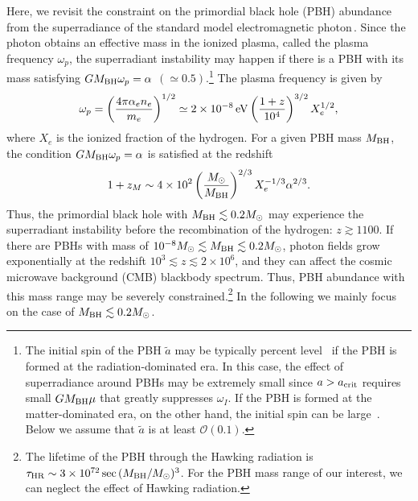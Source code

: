 \documentclass[%
 preprint,
 nofootinbib,
 amsmath,amssymb,
 aps,
 a4paper
]{revtex4-1}
\begin{document}
Here, we revisit the constraint on the primordial black hole (PBH) abundance from the superradiance of the standard model electromagnetic photon\,\cite{Pani:2013hpa}.
Since the photon obtains an effective mass in the ionized plasma, called the plasma frequency $\omega_p$, the superradiant instability may happen if there is a PBH with its mass satisfying $GM_{\rm BH}\omega_p = \alpha$ $(\simeq 0.5)$.\footnote{
	The initial spin of the PBH $\tilde a$ may be typically percent level~\cite{Chiba:2017rvs,Mirbabayi:2019uph,DeLuca:2019buf} if the PBH is formed at the radiation-dominated era. In this case, the effect of superradiance around PBHs may be extremely small since $a> a_{\rm crit}$ requires small $GM_{\rm BH}\mu$ that greatly suppresses $\omega_I$. If the PBH is formed at the matter-dominated era, on the other hand, the initial spin can be large~\cite{Harada:2017fjm}. Below we assume that $\tilde a$ is at least $\mathcal O(0.1)$.
} The plasma frequency is given by
\begin{align}
	\omega_p = \left( \frac{4\pi \alpha_e n_e}{m_e} \right)^{1/2} \simeq 2\times 10^{-8}\,{\rm eV}\left( \frac{1+z}{10^4} \right)^{3/2} X_e^{1/2},
\end{align}
where $X_e$ is the ionized fraction of the hydrogen. For a given PBH mass $M_{\rm BH}$, the condition $GM_{\rm BH}\omega_p = \alpha$ is satisfied at the redshift
\begin{align}
	1+z_{M} \sim 4\times 10^2 \left(\frac{M_\odot}{M_{\rm BH}}\right)^{2/3}X_e^{-1/3} \alpha^{2/3}.  \label{z_M}
\end{align}
Thus, the primordial black hole with $M_{\rm BH} \lesssim 0.2 M_{\odot}$ may experience the superradiant instability before the recombination of the hydrogen: $z\gtrsim 1100$. 
If there are PBHs with mass of $10^{-8}M_\odot \lesssim M_{\rm BH} \lesssim 0.2 M_\odot$, photon fields grow exponentially at the redshift $10^3\lesssim z\lesssim 2\times 10^6$, and they can affect the cosmic microwave background (CMB) blackbody spectrum. Thus, PBH abundance with this mass range may be severely constrained.\footnote{
	The lifetime of the PBH through the Hawking radiation is $\tau_{\rm HR} \sim 3\times 10^{72}\,{\rm sec}\,(M_{\rm BH}/M_\odot)^3$. For the PBH mass range of our interest, we can neglect the effect of Hawking radiation. 
}
In the following we mainly focus on the case of $M_{\rm BH}\lesssim 0.2M_{\odot}$.
\end{document}
